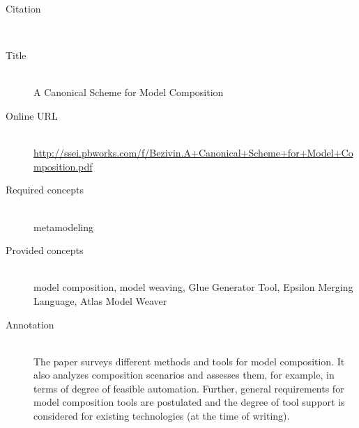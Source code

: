 \begin{description}
\item[Citation]\mbox{}\\
\cite{BezivinBFGJKKP06}
\item[Title]\mbox{}\\
A Canonical Scheme for Model Composition
\item[Online URL]\mbox{}\\
{\footnotesize\url{http://ssei.pbworks.com/f/Bezivin.A+Canonical+Scheme+for+Model+Composition.pdf}}
\item[Required concepts]\mbox{}\\
metamodeling\item[Provided concepts]\mbox{}\\
model composition, model weaving, Glue Generator Tool, Epsilon Merging Language, Atlas Model Weaver\item[Annotation]\mbox{}\\
The paper surveys different methods and tools for model composition. It also analyzes composition scenarios and assesses them, for example, in terms of degree of feasible automation. Further, general requirements for model composition tools are postulated and the degree of tool support is considered for existing technologies (at the time of writing).
\end{description}

